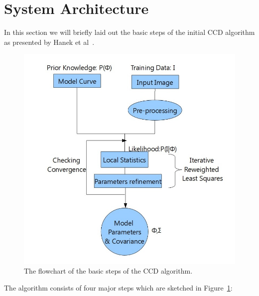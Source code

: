\documentclass[conference]{IEEEtran}
\begin{document}
\section{System Architecture}
\label{sec:arch}
In this section we will briefly laid out the basic steps of the initial
CCD algorithm as presented by Hanek et al~\cite{hanek2004contracting}.
\begin{figure}[htb]
  \centering
  \includegraphics[width=\columnwidth]{images/flowchart.jpg}
  \caption{The flowchart of the basic steps of the CCD algorithm.}
  \label{fig:flowchart}
\end{figure}
The algorithm consists of four major steps which are sketched in Figure~\ref{fig:flowchart}:
\end{document}
